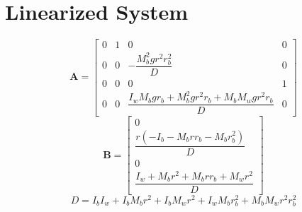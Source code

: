 \documentclass[12pt]{article}
\begin{document}
\section*{Linearized System}
\[
\mathbf{A} =
\begin{bmatrix}
0 & 1 & 0 & 0 \\
0 & 0 & -\dfrac{M_b^2 g r^2 r_b^2}{D} & 0 \\
0 & 0 & 0 & 1 \\
0 & 0 & \dfrac{I_w M_b g r_b + M_b^2 g r^2 r_b + M_b M_w g r^2 r_b}{D} & 0
\end{bmatrix}
\]
\[
\mathbf{B} =
\begin{bmatrix}
0 \\
\dfrac{r(-I_b - M_b r r_b - M_b r_b^2)}{D} \\
0 \\
\dfrac{I_w + M_b r^2 + M_b r r_b + M_w r^2}{D}
\end{bmatrix}
\]
\[
D = I_b I_w + I_b M_b r^2 + I_b M_w r^2 + I_w M_b r_b^2 + M_b M_w r^2 r_b^2
\]
\end{document}
